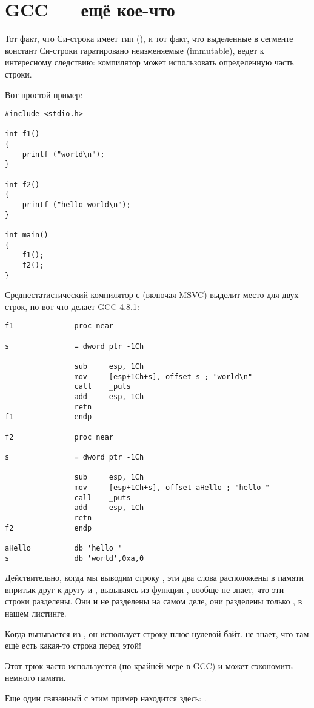 \section{GCC --- ещё кое-что}
\label{use_parts_of_C_strings}

Тот факт, что  Си-строка имеет тип  (), 
и тот факт, что выделенные в сегменте констант Си-строки гаратировано неизменяемые (immutable), 
ведет к интересному следствию: компилятор может использовать определенную часть строки.

Вот простой пример:

\begin{lstlisting}
#include <stdio.h>

int f1()
{
	printf ("world\n");
}

int f2()
{
	printf ("hello world\n");
}

int main()
{
	f1();
	f2();
}
\end{lstlisting}

Среднестатистический компилятор с \CCpp (включая MSVC) выделит место для двух строк, но вот что делает GCC 4.8.1:

\begin{lstlisting}[caption=GCC 4.8.1 + листинг в IDA]
f1              proc near

s               = dword ptr -1Ch

                sub     esp, 1Ch
                mov     [esp+1Ch+s], offset s ; "world\n"
                call    _puts
                add     esp, 1Ch
                retn
f1              endp

f2              proc near

s               = dword ptr -1Ch

                sub     esp, 1Ch
                mov     [esp+1Ch+s], offset aHello ; "hello "
                call    _puts
                add     esp, 1Ch
                retn
f2              endp

aHello          db 'hello '
s               db 'world',0xa,0
\end{lstlisting}

Действительно, когда мы выводим строку , 
эти два слова расположены в памяти впритык друг к другу и \puts, вызываясь из функции , вообще не знает,
что эти строки разделены. Они и не разделены на самом деле, они разделены
только , в нашем листинге.

Когда \puts вызывается из , он использует строку  плюс нулевой байт. \puts не знает, что там ещё есть какая-то строка перед этой!

Этот трюк часто используется (по крайней мере в GCC) и может сэкономить немного памяти.

Еще один связанный с этим пример находится здесь: .

